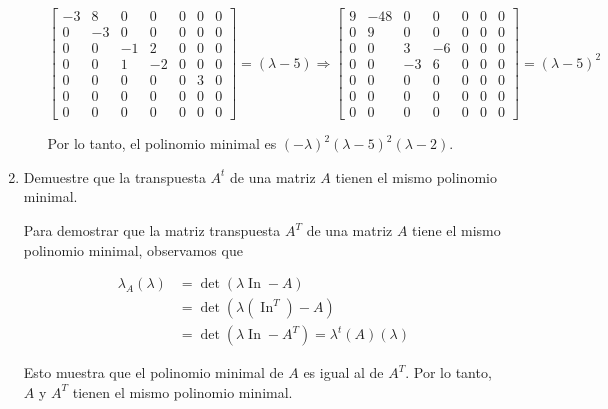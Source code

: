 \documentclass{report}
\begin{document}
\begin{enumerate}
\begin{enumerate}
            \[
            \begin{bmatrix}
            -3 & 8 & 0 & 0 & 0 & 0 & 0 \\
            0 & -3 & 0 & 0 & 0 & 0 & 0 \\
            0 & 0 & -1 & 2 & 0 & 0 & 0 \\
            0 & 0 & 1 & -2 & 0 & 0 & 0 \\
            0 & 0 & 0 & 0 & 0 & 3 & 0 \\
            0 & 0 & 0 & 0 & 0 & 0 & 0 \\
            0 & 0 & 0 & 0 & 0 & 0 & 0
            \end{bmatrix}
            = (\lambda-5) \Rightarrow
            \begin{bmatrix}
            9 & -48 & 0 & 0 & 0 & 0 & 0 \\
            0 & 9 & 0 & 0 & 0 & 0 & 0 \\
            0 & 0 & 3 & -6 & 0 & 0 & 0 \\
            0 & 0 & -3 & 6 & 0 & 0 & 0 \\
            0 & 0 & 0 & 0 & 0 & 0 & 0 \\
            0 & 0 & 0 & 0 & 0 & 0 & 0 \\
            0 & 0 & 0 & 0 & 0 & 0 & 0
            \end{bmatrix}
            = (\lambda-5)^{2}
            \]
            
            Por lo tanto, el polinomio minimal es $(-\lambda)^{2}(\lambda-5)^{2}(\lambda-2)$.
        \end{enumerate}

        \item Demuestre que la transpuesta $A^t$ de una matriz $A$ tienen el mismo polinomio minimal.
        
        Para demostrar que la matriz transpuesta $A^T$ de una matriz $A$ tiene el mismo polinomio minimal, observamos que

        \[
        \begin{aligned}
        \lambda_{A}(\lambda) & = \operatorname{det}(\lambda \operatorname{In}-A) \\
        & = \operatorname{det}(\lambda(\operatorname{In}^T)-A) \\
        & = \operatorname{det}(\lambda \operatorname{In}-A^{T}) = \lambda^{t}(A)(\lambda)
        \end{aligned}
        \]

        Esto muestra que el polinomio minimal de $A$ es igual al de $A^T$. Por lo tanto, $A$ y $A^T$ tienen el mismo polinomio minimal.


\end{enumerate}
\end{document}
